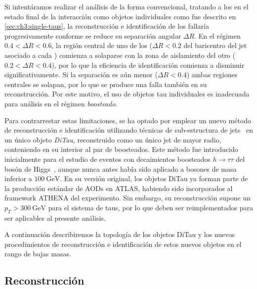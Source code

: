 \begin{marginfigure}[-53em]
    \caption{Distribuciones de la separación angular $\Delta R$ , $p_T$ de los $\tau_{\text{had}}$ \textit{leading}  y \textit{subleading}  producidos por el decaimiento de un pseudoescalar $X$ de \num{20} y \SI{60}{\GeV}.}
    \label{fig:ch3:ditau:truth}
\end{marginfigure}

Si intentáramos realizar el análisis de la forma convencional, tratando a los \ttaus en el estado final de la interacción como objetos \thad individuales como fue descrito en \ref{sec:ch3:single-taus}, la reconstrucción e identificación de los \thads fallaría progresivamente conforme se reduce su separación angular $\Delta R$. En el régimen $0.4 < \Delta R < 0.6$, la región central de uno de los \thad (${\Delta R < 0.2}$ del baricentro del jet asociado a cada \thad) comienza a solaparse con la zona de aislamiento del otro \thad ($0.2 < \Delta R < 0.4$), por lo que la eficiencia de identificación comienza a disminuir significativamente. Si la separación es aún menor ($\Delta R < 0.4$) ambas regiones centrales se solapan, por lo que se produce una falla también en su reconstrucción. Por este motivo, el uso de objetos tau individuales es inadecuada para análisis en el régimen \textit{boosteado}.

Para contrarrestar estas limitaciones, se ha optado por emplear un nuevo método de reconstrucción e identificación utilizando técnicas de sub-estructura de jets~\cite{Han2017} en un único objeto \textit{DiTau}, reconstruido como un único jet de mayor radio, conteniendo en su interior al par de \thads boosteados. Este método fue introducido inicialmente para el estudio de eventos con decaimientos boosteados $h\to\tau\tau$ del bosón de Higgs~\cite{Kirchmeier2015}, aunque nunca antes había sido aplicado a bosones de masa inferior a $\SI{100}{\GeV}$. En su versión original, los objetos DiTau ya forman parte de la producción estándar de AODs en ATLAS, habiendo sido incorporados al framework ATHENA del experimento. Sin embargo, su reconstrucción supone un $p_T > \SI{300}{\GeV}$ para el sistema de taus, por lo que deben ser reimplementados para ser aplicables al presente análisis.

A continuación describiremos la topología de los objetos DiTau y los nuevos procedimientos de reconstrucción e identificación de estos nuevos objetos en el rango de bajas masas.



\subsection{Reconstrucción}


